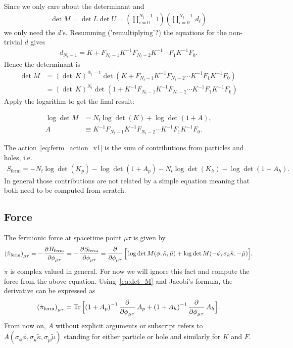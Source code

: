 \documentclass[a4paper, fleqn, twoside, notitlepage]{scrartcl}
\begin{document}
Since we only care about the determinant and
\begin{align}
  \det M = \det L \det U = (\prod_{i=0}^{N_t-1}\,1) (\prod_{i=0}^{N_t-1}\,d_i)
\end{align}
we only need the $d$'s.
Resumming ('remultiplying'?) the equations for the non-trivial $d$ gives
\begin{align}
  d_{N_t-1} = K + F_{N_t-1}K^{-1} F_{N_t-2}K^{-1} \cdots F_{1}K^{-1} F_{0}.
\end{align}
Hence the determinant is
\begin{align}
  \det M &= {(\det\,K)}^{N_t-1} \det (K + F_{N_t-1}K^{-1} F_{N_t-2} \cdots K^{-1}F_{1}K^{-1} F_{0})\\
         &= {(\det\,K)}^{N_t} \det(1 + K^{-1}F_{N_t-1}K^{-1} F_{N_t-2} \cdots K^{-1}F_{1}K^{-1} F_{0})
\end{align}
Apply the logarithm to get the final result:
\begin{resultbox}
  \vspace{-\baselineskip}
  \begin{align}
    \log \det M &= N_t \log \det(K)  + \log \det (1 + A),\label{eq:det_M}\\
    A &\equiv K^{-1}F_{N_t-1}K^{-1} F_{N_t-2} \cdots K^{-1}F_{1}K^{-1} F_{0}.\label{eq:def_A}
  \end{align}
\end{resultbox}
\noindent
The action~\eqref{eq:ferm_action_v1} is the sum of contributions from particles and holes, i.e.
\begin{align}
  S_\text{ferm} = -N_t \log \det(K_p)  - \log \det (1 + A_p) - N_t \log \det(K_h) - \log \det (1 + A_h).
\end{align}
In general those contributions are not related by a simple equation meaning that both need to be computed from scratch.
  
\subsection{Force}

The fermionic force at spacetime point $\mu\tau$ is given by
\begin{align}
  {(\dot{\pi}_{\text{ferm}})}_{\mu\tau} = -\dpd{H_{\text{ferm}}}{\phi_{\mu\tau}} = -\dpd{S_\text{ferm}}{\phi_{\mu\tau}} =  \dpd{}{\phi_{\mu\tau}} \Big[\log \det M(\phi, \tilde{\kappa}, \tilde{\mu}) + \log \det M(-\phi, \sigma_{\tilde{\kappa}}\tilde{\kappa}, -\tilde{\mu})\Big].
\end{align}
$\dot{\pi}$ is complex valued in general. For now we will ignore this fact and compute the force from the above equation.
Using~\eqref{eq:det_M} and Jacobi's formula, the derivative can be expressed as
\begin{align}
  {(\dot{\pi}_{\text{ferm}})}_{\mu\tau} = \Tr \Big[{(1+A_p)}^{-1}\dpd{}{\phi_{\mu\tau}}A_p + {(1+A_h)}^{-1}\dpd{}{\phi_{\mu\tau}}A_h\Big].
\end{align}
From now on, $A$ without explicit arguments or subscript refers to $A(\sigma_\phi\phi, \sigma_{\tilde{\kappa}}\tilde{\kappa}, \sigma_{\tilde{\mu}}\tilde{\mu})$ standing for either particle or hole and similarly for $K$ and $F$.\\
\end{document}
